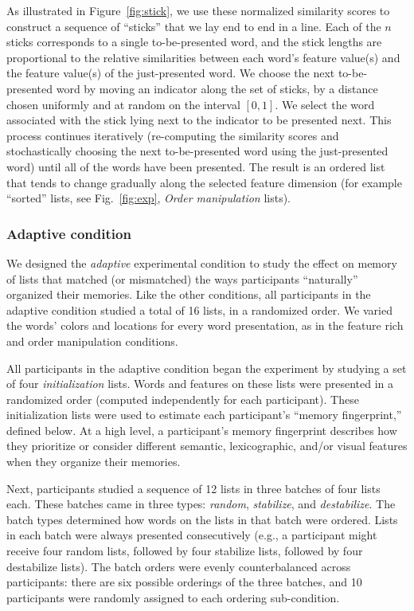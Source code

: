 \documentclass[11pt]{article}
\begin{document}
As illustrated in Figure~\ref{fig:stick}, we use these normalized similarity
scores to construct a sequence of ``sticks'' that we lay end to end in a line.
Each of the $n$ sticks corresponds to a single to-be-presented word, and the
stick lengths are proportional to the relative similarities between each word's
feature value(s) and the feature value(s) of the just-presented word. We choose
the next to-be-presented word by moving an indicator along the set of sticks,
by a distance chosen uniformly and at random on the interval $\left[0,
1\right]$. We select the word associated with the stick lying next to the
indicator to be presented next. This process continues iteratively
(re-computing the similarity scores and stochastically choosing the next
to-be-presented word using the just-presented word) until all of the words have
been presented. The result is an ordered list that tends to change gradually
along the selected feature dimension (for example ``sorted'' lists, see
Fig.~\ref{fig:exp}, \textit{Order manipulation} lists).

\subsubsection*{Adaptive condition}

We designed the \textit{adaptive} experimental condition to study the effect on
memory of lists that matched (or mismatched) the ways participants
``naturally'' organized their memories. Like the other conditions, all
participants in the adaptive condition studied a total of 16 lists, in a
randomized order. We varied the words' colors and locations for every word
presentation, as in the feature rich and order manipulation conditions.

All participants in the adaptive condition began the experiment by studying a
set of four \textit{initialization} lists. Words and features on these lists
were presented in a randomized order (computed independently for each
participant). These initialization lists were used to estimate each
participant's ``memory fingerprint,'' defined below. At a high level, a
participant's memory fingerprint describes how they prioritize or consider
different semantic, lexicographic, and/or visual features when they organize
their memories.

Next, participants studied a sequence of 12 lists in three batches of four
lists each. These batches came in three types: \textit{random},
\textit{stabilize}, and \textit{destabilize}. The batch types determined how
words on the lists in that batch were ordered. Lists in each batch were always
presented consecutively (e.g., a participant might receive four random lists,
followed by four stabilize lists, followed by four destabilize lists). The
batch orders were evenly counterbalanced across participants: there are six
possible orderings of the three batches, and 10 participants were randomly
assigned to each ordering sub-condition.
\end{document}

